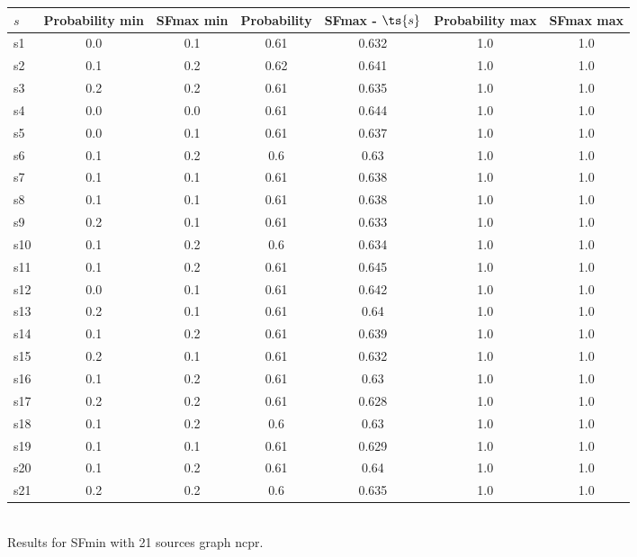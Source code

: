 \documentclass{article}
\begin{document}
\noindent\begin{tabular}{|l|c|c|c|c|c|c|}
\hline
$s$& Probability min & SFmax min & Probability & SFmax - $\ts{s}$ & Probability max & SFmax max\\
\hline
s1 &0.0 & 0.1 & 0.61 & 0.632 & 1.0 & 1.0\\
\hline
s2 &0.1 & 0.2 & 0.62 & 0.641 & 1.0 & 1.0\\
\hline
s3 &0.2 & 0.2 & 0.61 & 0.635 & 1.0 & 1.0\\
\hline
s4 &0.0 & 0.0 & 0.61 & 0.644 & 1.0 & 1.0\\
\hline
s5 &0.0 & 0.1 & 0.61 & 0.637 & 1.0 & 1.0\\
\hline
s6 &0.1 & 0.2 & 0.6 & 0.63 & 1.0 & 1.0\\
\hline
s7 &0.1 & 0.1 & 0.61 & 0.638 & 1.0 & 1.0\\
\hline
s8 &0.1 & 0.1 & 0.61 & 0.638 & 1.0 & 1.0\\
\hline
s9 &0.2 & 0.1 & 0.61 & 0.633 & 1.0 & 1.0\\
\hline
s10 &0.1 & 0.2 & 0.6 & 0.634 & 1.0 & 1.0\\
\hline
s11 &0.1 & 0.2 & 0.61 & 0.645 & 1.0 & 1.0\\
\hline
s12 &0.0 & 0.1 & 0.61 & 0.642 & 1.0 & 1.0\\
\hline
s13 &0.2 & 0.1 & 0.61 & 0.64 & 1.0 & 1.0\\
\hline
s14 &0.1 & 0.2 & 0.61 & 0.639 & 1.0 & 1.0\\
\hline
s15 &0.2 & 0.1 & 0.61 & 0.632 & 1.0 & 1.0\\
\hline
s16 &0.1 & 0.2 & 0.61 & 0.63 & 1.0 & 1.0\\
\hline
s17 &0.2 & 0.2 & 0.61 & 0.628 & 1.0 & 1.0\\
\hline
s18 &0.1 & 0.2 & 0.6 & 0.63 & 1.0 & 1.0\\
\hline
s19 &0.1 & 0.1 & 0.61 & 0.629 & 1.0 & 1.0\\
\hline
s20 &0.1 & 0.2 & 0.61 & 0.64 & 1.0 & 1.0\\
\hline
s21 &0.2 & 0.2 & 0.6 & 0.635 & 1.0 & 1.0\\
\hline
\end{tabular}\\

\noindent Results for SFmin with 21 sources graph ncpr.
\end{document}
